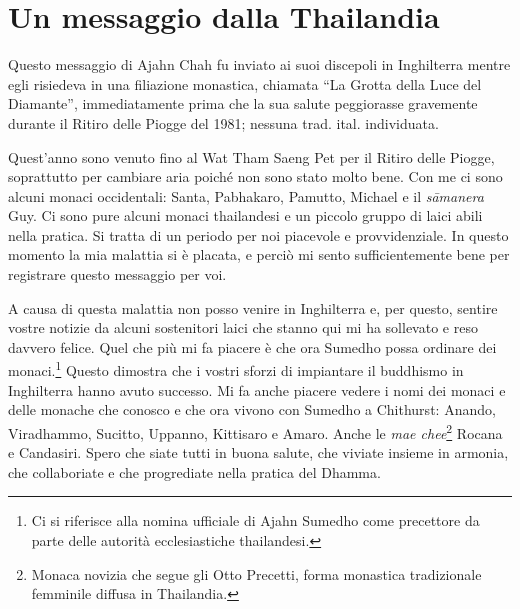 \chapter{Un messaggio dalla Thailandia}

\begin{openingQuote}
  Questo messaggio di Ajahn Chah fu inviato ai suoi discepoli in Inghilterra
  mentre egli risiedeva in una filiazione monastica, chiamata ``La Grotta della
  Luce del Diamante'', immediatamente prima che la sua salute peggiorasse
  gravemente durante il Ritiro delle Piogge del 1981; nessuna trad. ital.
  individuata.
\end{openingQuote}

Quest'anno sono venuto fino al Wat Tham Saeng Pet per il Ritiro delle
Piogge, soprattutto per cambiare aria poiché non sono stato molto bene.
Con me ci sono alcuni monaci occidentali: Santa, Pabhakaro, Pamutto,
Michael e il \emph{sāmanera} Guy. Ci sono pure alcuni monaci thailandesi
e un piccolo gruppo di laici abili nella pratica. Si tratta di un
periodo per noi piacevole e provvidenziale. In questo momento la mia
malattia si è placata, e perciò mi sento sufficientemente bene per
registrare questo messaggio per voi.

A causa di questa malattia non posso venire in Inghilterra e, per
questo, sentire vostre notizie da alcuni sostenitori laici che stanno
qui mi ha sollevato e reso davvero felice. Quel che più mi fa piacere è
che ora Sumedho possa ordinare dei monaci.\footnote{Ci si riferisce alla
  nomina ufficiale di Ajahn Sumedho come precettore da parte delle
  autorità ecclesiastiche thailandesi.} Questo dimostra che i vostri
sforzi di impiantare il buddhismo in Inghilterra hanno avuto successo.
Mi fa anche piacere vedere i nomi dei monaci e delle monache che conosco
e che ora vivono con Sumedho a Chithurst: Anando, Viradhammo, Sucitto,
Uppanno, Kittisaro e Amaro. Anche le \emph{mae chee}\footnote{Monaca
  novizia che segue gli Otto Precetti, forma monastica tradizionale
  femminile diffusa in Thailandia.} Rocana e Candasiri. Spero che siate
tutti in buona salute, che viviate insieme in armonia, che collaboriate
e che progrediate nella pratica del Dhamma.

